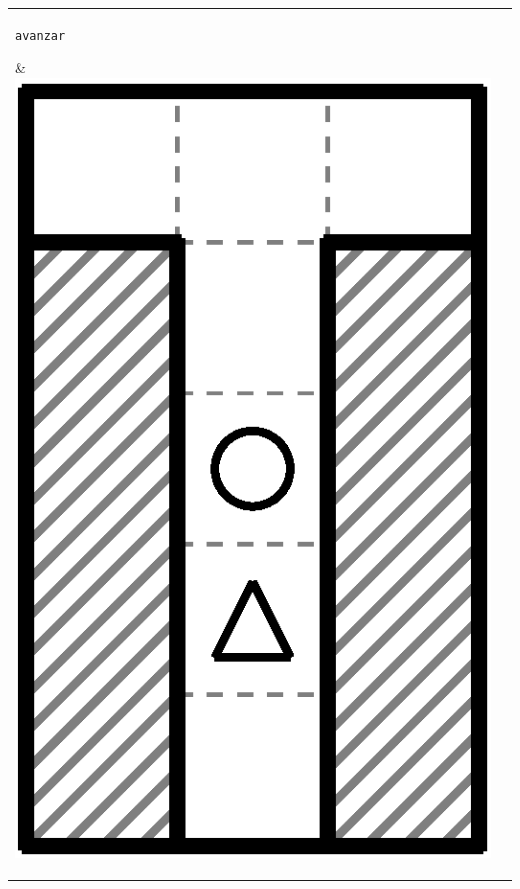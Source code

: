 \documentclass{oci}
\newcommand*{\tabbox}[2][t]{\vspace{0pt}\parbox[#1][2.3\baselineskip]{20em}{\strut#2\strut}}
\begin{document}
\begin{problemDescription}
\begin{center}
\begin{tabular}{|V|V|}
    \tabbox{\texttt{avanzar}}                         &\includegraphics[angle=90, scale=0.25]{laberintos/ejemplo1-3.eps}\\

\end{tabular}
\end{center}
\end{problemDescription}
\end{document}
